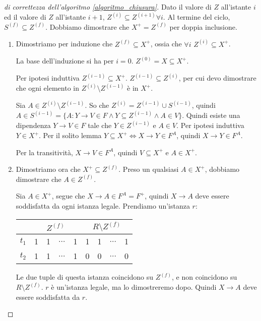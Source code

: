 \begin{proof}[di correttezza dell'algoritmo \ref{algoritmo_chiusura}]
Dato il valore di $Z$ all'istante $i$ ed il valore di $Z$ all'istante $i + 1$, $Z^{(i)} \subseteq Z^{(i+1)} \forall i$. Al termine del ciclo, $S^{(f)} \subseteq Z^{(f)}$. Dobbiamo dimostrare che $X^+ = Z^{(f)}$ per doppia inclusione.

\begin{enumerate}
    \item Dimostriamo per induzione che $Z^{(f)} \subseteq X^+$, ossia che $\forall i $ $Z^{(i)} \subseteq X^+$.

    La base dell'induzione si ha per $i = 0$. $Z^{(0)} = X \subseteq X^+$.

    Per ipotesi induttiva $Z^{(i-1)} \subseteq X^+$. $Z^{(i-1)} \subseteq Z^{(i)}$, per cui devo dimostrare che ogni elemento in $Z^{(i)} \setminus Z^{(i - 1)}$ \`e in $X^+$.

    Sia $A \in Z^{(i)} \setminus Z^{(i - 1)}$. So che $Z^{(i)} = Z^{(i - 1)} \cup S^{(i - 1)}$, quindi $A \in S^{(i-1)} = \{ A : Y \to V \in F \land Y \subseteq Z^{(i-1)} \land A \in V\}$. Quindi esiste una dipendenza $Y \to V \in F$ tale che $Y \in Z^{(i-1)}$ e $A \in V$. Per ipotesi induttiva $Y \in X^+$. Per il solito lemma $Y \subseteq X^+ \iff X \to Y \in F^A$, quindi $X \to Y \in F^A$.

    Per la transitivit\`a, $X \to V \in F^A$, quindi $V \subseteq X^+$ e $A \in X^+$.
    \item  Dimostriamo ora che $X^+ \subseteq Z^{(f)}$. Preso un qualsiasi $A \in X^+$, dobbiamo dimostrare che $A \in Z^{(f)}$.

    Sia $A \in X^+$, segue che $X \to A \in F^A = F^+$, quindi $X \to A$ deve essere soddisfatta da ogni istanza legale. Prendiamo un'istanza $r$:

    \begin{center}
    \begin{tabular}{|l|*{8}{c|}}
    \hline
    & \multicolumn{4}{c|}{$Z^{(f)}$} 
    & \multicolumn{4}{c|}{$R \setminus Z^{(f)}$} \\
    \hline
    $t_1$ & 1 & 1 & $\dots$ & 1 & 1 & 1 & $\dots$ & 1 \\
    \hline
    $t_2$ & 1 & 1 & $\dots$ & 1 & 0 & 0 & $\dots$ & 0 \\
    \hline 
    \end{tabular}
    \end{center}

    Le due tuple di questa istanza coincidono su $Z^{(f)}$, e non coincidono su $R \setminus Z^{(f)}$. $r$ \`e un'istanza legale, ma lo dimostreremo dopo. Quindi $X \to A$ deve essere soddisfatta da $r$.


\end{enumerate}
\end{proof}
